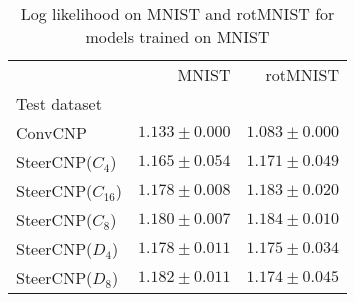 \begin{table}
\centering
\caption{Log likelihood on MNIST and rotMNIST for models trained on MNIST}
\label{tab:mnist_tests}
\begin{tabular}{lrr}
\toprule
{} &                       MNIST &                    rotMNIST \\
Test dataset       &                             &                             \\
\midrule
ConvCNP            &         ${1.133 \pm 0.000}$ &         ${1.083 \pm 0.000}$ \\
SteerCNP($C_4$)    &  $\mathbf{1.165 \pm 0.054}$ &  $\mathbf{1.171 \pm 0.049}$ \\
SteerCNP($C_{16}$) &  $\mathbf{1.178 \pm 0.008}$ &  $\mathbf{1.183 \pm 0.020}$ \\
SteerCNP($C_{8}$)  &  $\mathbf{1.180 \pm 0.007}$ &  $\mathbf{1.184 \pm 0.010}$ \\
SteerCNP($D_4$)    &  $\mathbf{1.178 \pm 0.011}$ &  $\mathbf{1.175 \pm 0.034}$ \\
SteerCNP($D_8$)    &  $\mathbf{1.182 \pm 0.011}$ &  $\mathbf{1.174 \pm 0.045}$ \\
\bottomrule
\end{tabular}
\end{table}
